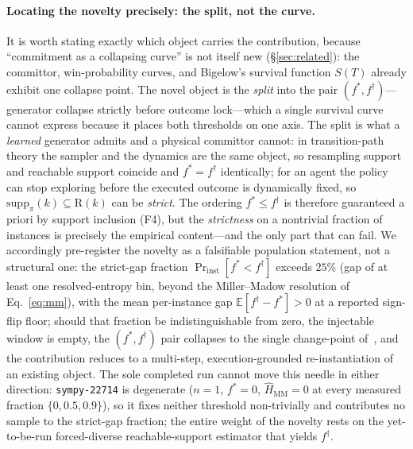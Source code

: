 \documentclass[11pt]{article}
\begin{document}
\paragraph{Locating the novelty precisely: the split, not the curve.}
It is worth stating exactly which object carries the contribution, because
``commitment as a collapsing curve'' is not itself new
(\S\ref{sec:related}): the committor, win-probability curves, and Bigelow's
survival function $S(T)$ already exhibit one collapse point. The novel object is
the \emph{split} into the pair $(f^\ast,f^\dagger)$---generator collapse strictly
before outcome lock---which a single survival curve cannot express because it
places both thresholds on one axis. The split is what a \emph{learned} generator
admits and a physical committor cannot: in transition-path theory the sampler and
the dynamics are the same object, so resampling support and reachable support
coincide and $f^\ast=f^\dagger$ identically; for an agent the policy can stop
exploring before the executed outcome is dynamically fixed, so
$\mathrm{supp}_\pi(k)\subseteq\mathrm{R}(k)$ can be \emph{strict}. The ordering
$f^\ast\le f^\dagger$ is therefore guaranteed a priori by support inclusion (F4),
but the \emph{strictness} on a nontrivial fraction of instances is precisely the
empirical content---and the only part that can fail. We accordingly pre-register the
novelty as a falsifiable population statement, not a structural one: the strict-gap
fraction $\Pr_{\text{inst}}[f^\ast<f^\dagger]$ exceeds $25\%$ (gap of at least one
resolved-entropy bin, beyond the Miller--Madow resolution of Eq.~\eqref{eq:mm}),
with the mean per-instance gap $\mathbb{E}[f^\dagger-f^\ast]>0$ at a reported
sign-flip floor; should that fraction be indistinguishable from zero, the injectable
window is empty, the $(f^\ast,f^\dagger)$ pair collapses to the single change-point
of~\citep{bigelow2024forking}, and the contribution reduces to a multi-step,
execution-grounded re-instantiation of an existing object. The sole completed run
cannot move this needle in either direction: \texttt{sympy-22714} is degenerate
($n\!=\!1$, $f^\ast=0$, $\widehat{H}_{\mathrm{MM}}=0$ at every measured fraction
$\{0,0.5,0.9\}$), so it fixes neither threshold non-trivially and contributes no
sample to the strict-gap fraction; the entire weight of the novelty rests on the
yet-to-be-run forced-diverse reachable-support estimator that yields $f^\dagger$.
\end{document}
